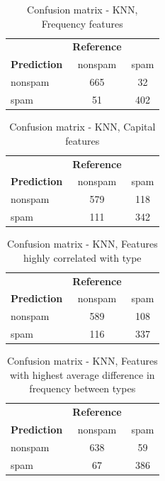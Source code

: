 \documentclass{article}\usepackage[]{graphicx}\usepackage[]{xcolor}
\begin{document}
\begin{table}[h]
    \centering
    \begin{tabular}{lcc}
        & \textbf{Reference} & \\
        \textbf{Prediction} & nonspam & spam \\
        nonspam & 665 & 32 \\
        spam & 51 & 402 \\
    \end{tabular}
    \caption{Confusion matrix - KNN, Frequency features}
    \label{KNNcm2}
\end{table}
\begin{table}[h]
    \centering
    \begin{tabular}{lcc}
        & \textbf{Reference} & \\
        \textbf{Prediction} & nonspam & spam \\
        nonspam & 579 & 118 \\
        spam & 111 & 342 \\
    \end{tabular}
    \caption{Confusion matrix - KNN, Capital features}
    \label{KNNcm3}
\end{table}
\begin{table}[h]
    \centering
    \begin{tabular}{lcc}
        & \textbf{Reference} & \\
        \textbf{Prediction} & nonspam & spam \\
        nonspam & 589 & 108 \\
        spam & 116 & 337 \\
    \end{tabular}
    \caption{Confusion matrix - KNN, Features highly correlated with type}
    \label{KNNcm4}
\end{table}
\begin{table}[h]
    \centering
    \begin{tabular}{lcc}
        & \textbf{Reference} & \\
        \textbf{Prediction} & nonspam & spam \\
        nonspam & 638 & 59 \\
        spam & 67 & 386 \\
    \end{tabular}
    \caption{Confusion matrix - KNN, Features with highest average difference in frequency between types}
    \label{KNNcm5}
\end{table}
\end{document}
